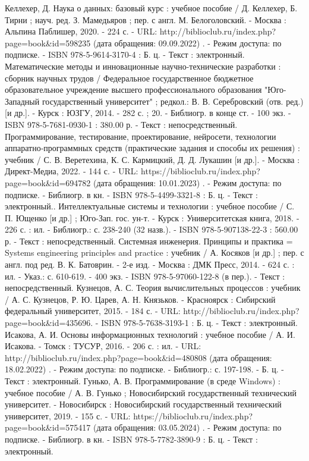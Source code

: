 \begin{thebibliography}{9}
	 Келлехер, Д.    Наука о данных: базовый курс : учебное пособие / Д. Келлехер, Б. Тирни ; науч. ред. З. Мамедьяров ; пер. с англ. М. Белоголовский. - Москва : Альпина Паблишер, 2020. - 224 с. - URL: http://biblioclub.ru/index.php?page=book\&id=598235 (дата обращения: 09.09.2022) . - Режим доступа: по подписке. - ISBN 978-5-9614-3170-4 : Б. ц. - Текст : электронный.
	 Математические методы и инновационные научно-технические разработки : сборник научных трудов / Федеральное государственное бюджетное образовательное учреждение высшего профессионального образования "Юго-Западный государственный университет" ; редкол.: В. В. Серебровский (отв. ред.) [и др.]. - Курск : ЮЗГУ, 2014. - 282 с. ; 20. - Библиогр. в конце ст. - 100 экз. - ISBN 978-5-7681-0930-1 : 380.00 р. - Текст : непосредственный.
	 Программирование, тестирование, проектирование, нейросети, технологии аппаратно‐программных средств (практические задания и способы их решения) : учебник / С. В. Веретехина, К. С. Кармицкий, Д. Д. Лукашин [и др.]. - Москва : Директ-Медиа, 2022. - 144 с. - URL: https://biblioclub.ru/index.php?page=book\&id=694782 (дата обращения: 10.01.2023) . - Режим доступа: по подписке. - Библиогр. в кн. - ISBN 978-5-4499-3321-8 : Б. ц. - Текст : электронный..    
	 Интеллектуальные системы и технологии : учебное пособие / С. П. Ющенко [и др.] ; Юго-Зап. гос. ун-т. - Курск : Университетская книга, 2018. - 226 с. : ил. - Библиогр.: с. 238-240 (32 назв.). - ISBN 978-5-907138-22-3 : 560.00 р. - Текст : непосредственный.    
	\bibitem{} Системная инженерия. Принципы и практика = Systems engineering principles and practice : учебник / А. Косяков [и др.] ; пер. с англ. под ред. В. К. Батоврин. - 2-е изд. - Москва : ДМК Пресс, 2014. - 624 с. : ил. - Указ.: с. 610-619. - 400 экз. - ISBN 978-5-97060-122-8 (в пер.). - Текст : непосредственный.    
	\bibitem{} Кузнецов, А. С.    Теория вычислительных процессов  : учебник / А. С. Кузнецов, Р. Ю. Царев, А. Н. Князьков. - Красноярск : Сибирский федеральный университет, 2015. - 184 с. - URL: http://biblioclub.ru/index.php?page=book\&id=435696. - ISBN 978-5-7638-3193-1 : Б. ц.  - Текст : электронный.    
	\bibitem{} Исакова, А. И.    Основы информационных технологий : учебное пособие / А. И. Исакова. - Томск : ТУСУР, 2016. - 206 с. : ил. - URL: http://biblioclub.ru/index.php?page=book\&id=480808 (дата обращения: 18.02.2022) . - Режим доступа: по подписке. - Библиогр.: с. 197-198. - Б. ц. - Текст : электронный.
	\bibitem{} Гунько, А. В.    Программирование (в среде Windows) : учебное пособие / А. В. Гунько ; Новосибирский государственный технический университет. - Новосибирск : Новосибирский государственный технический университет, 2019. - 155 с. - URL: https://biblioclub.ru/index.php?page=book\&id=575417 (дата обращения: 03.05.2024) . - Режим доступа: по подписке. - Библиогр. в кн. - ISBN 978-5-7782-3890-9 : Б. ц. - Текст : электронный.

\end{thebibliography}
